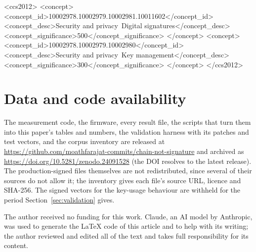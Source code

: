 \documentclass[acmsmall,screen,review]{acmart}
\begin{document}
\begin{CCSXML}
<ccs2012>
<concept>
<concept_id>10002978.10002979.10002981.10011602</concept_id>
<concept_desc>Security and privacy~Digital signatures</concept_desc>
<concept_significance>500</concept_significance>
</concept>
<concept>
<concept_id>10002978.10002979.10002980</concept_id>
<concept_desc>Security and privacy~Key management</concept_desc>
<concept_significance>300</concept_significance>
</concept>
</ccs2012>
\end{CCSXML}


\maketitle














\section*{Data and code availability}
The measurement code, the firmware, every result file, the scripts that turn
them into this paper's tables and numbers, the validation harness with its
patches and test vectors, and the corpus inventory are released at
\url{https://github.com/moathfarajat-commits/chain-not-signature} and archived as
\url{https://doi.org/10.5281/zenodo.24091528} (the DOI resolves to the latest release). The production-signed files
themselves are not redistributed, since several of their sources do not
allow it; the inventory gives each file's source URL, licence and SHA-256.
The signed vectors for the key-usage behaviour are withheld for the period
Section~\ref{sec:validation} gives.

\begin{acks}
The author received no funding for this work. Claude, an AI model by
Anthropic, was used to generate the LaTeX code of this article and to help
with its writing; the author reviewed and edited all of the text and takes
full responsibility for its content.
\end{acks}



\end{document}
